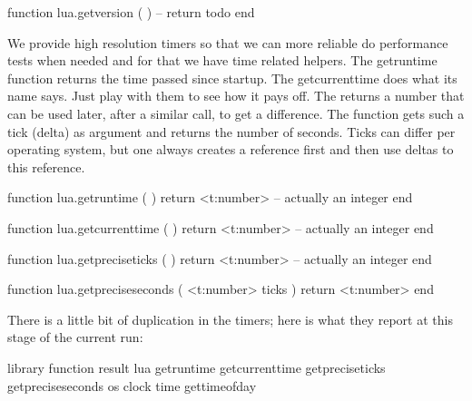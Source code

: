 \starttyping[option=LUA]
function lua.getversion ( )
    -- return todo
end
\stoptyping

We provide high resolution timers so that we can more reliable do performance
tests when needed and for that we have time related helpers. The \type
{getruntime} function returns the time passed since startup. The \type
{getcurrenttime} does what its name says. Just play with them to see how it pays
off. The  returns a number that can be used later, after a
similar call, to get a difference. The  function gets
such a tick (delta) as argument and returns the number of seconds. Ticks can
differ per operating system, but one always creates a reference first and then
use deltas to this reference.

\stopsubsection

\startsubsection[title=Timers]

\starttyping[option=LUA]
function lua.getruntime ( )
    return <t:number> -- actually an integer
end
\stoptyping

\starttyping[option=LUA]
function lua.getcurrenttime ( )
    return <t:number> -- actually an integer
end
\stoptyping

\starttyping[option=LUA]
function lua.getpreciseticks ( )
    return <t:number> -- actually an integer
end
\stoptyping

\starttyping[option=LUA]
function lua.getpreciseseconds ( <t:number> ticks )
    return <t:number>
end
\stoptyping

There is a little bit of duplication in the timers; here is what they report at
this stage of the current run:

\starttabulate[|lT|lT|l|]
    \FL
    \BC library \NC function              \BC result                               \NC \NR
    \TL
    \NC lua     \NC getruntime        \NC {}        \NC \NR
    \NC         \NC getcurrenttime    \NC {}    \NC \NR %
    \NC         \NC getpreciseticks   \NC {}   \NC \NR
    \NC         \NC getpreciseseconds \NC {} \NC \NR
    \ML
    \NC os      \NC clock             \NC {}              \NC \NR
    \NC         \NC time              \NC {}               \NC \NR
    \NC         \NC gettimeofday      \NC {}       \NC \NR
    \LL
\stoptabulate

\stopsubsection

